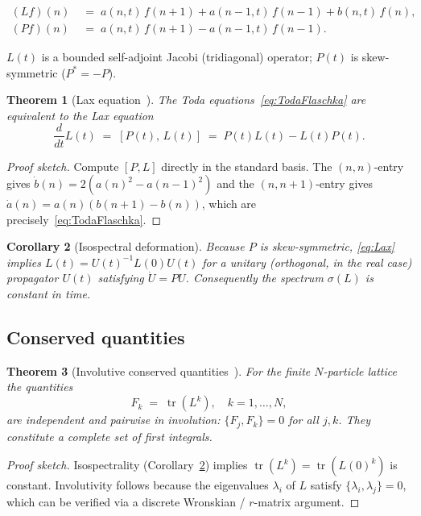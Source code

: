 \documentclass[12pt,a4paper]{article}
\newtheorem{theorem}{Theorem}[section]
\newtheorem{corollary}[theorem]{Corollary}
\theoremstyle{definition}
\newcommand{\tr}{\operatorname{tr}}
\begin{document}
\begin{align}
  (Lf)(n) &\;=\; a(n,t)\,f(n+1) + a(n-1,t)\,f(n-1) + b(n,t)\,f(n),
  \label{eq:L}\\
  (Pf)(n) &\;=\; a(n,t)\,f(n+1) - a(n-1,t)\,f(n-1).
  \label{eq:P}
\end{align}

$L(t)$ is a bounded self-adjoint Jacobi (tridiagonal) operator;
$P(t)$ is skew-symmetric ($P^*=-P$).

\begin{theorem}[Lax equation~\cite{Flaschka1974,Manakov1974}]
The Toda equations~\eqref{eq:TodaFlaschka} are equivalent to the
\emph{Lax equation}
\begin{equation}\label{eq:Lax}
  \frac{d}{dt}L(t) \;=\; [P(t),\, L(t)] \;=\; P(t)L(t) - L(t)P(t).
\end{equation}
\end{theorem}

\begin{proof}[Proof sketch]
Compute $[P,L]$ directly in the standard basis.  The $(n,n)$-entry gives
$\dot{b}(n) = 2(a(n)^2-a(n-1)^2)$ and the $(n,n+1)$-entry gives
$\dot{a}(n) = a(n)(b(n+1)-b(n))$, which are precisely~\eqref{eq:TodaFlaschka}.
\end{proof}

\begin{corollary}[Isospectral deformation]\label{cor:isospec}
Because $P$ is skew-symmetric, \eqref{eq:Lax} implies
$L(t) = U(t)^{-1}L(0)U(t)$ for a unitary (orthogonal, in the real case)
propagator $U(t)$ satisfying $\dot{U}=PU$.  Consequently the spectrum
$\sigma(L)$ is constant in time.
\end{corollary}

\subsection{Conserved quantities}

\begin{theorem}[Involutive conserved quantities~\cite{Flaschka1974}]
For the finite $N$-particle lattice the quantities
\begin{equation}
  F_k \;=\; \tr(L^{k}), \quad k = 1,\ldots,N,
\end{equation}
are independent and pairwise in involution: $\{F_j,F_k\}=0$ for all
$j,k$.  They constitute a complete set of first integrals.
\end{theorem}

\begin{proof}[Proof sketch]
Isospectrality (Corollary~\ref{cor:isospec}) implies $\tr(L^k)=\tr(L(0)^k)$
is constant.  Involutivity follows because the eigenvalues $\lambda_i$ of
$L$ satisfy $\{\lambda_i,\lambda_j\}=0$, which can be verified via a
discrete Wronskian / $r$-matrix argument.
\end{proof}
\end{document}
